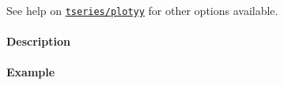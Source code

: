 See help on \href{tseries/plotyy}{\texttt{tseries/plotyy}} for other
options available.

\paragraph{Description}

\paragraph{Example}


